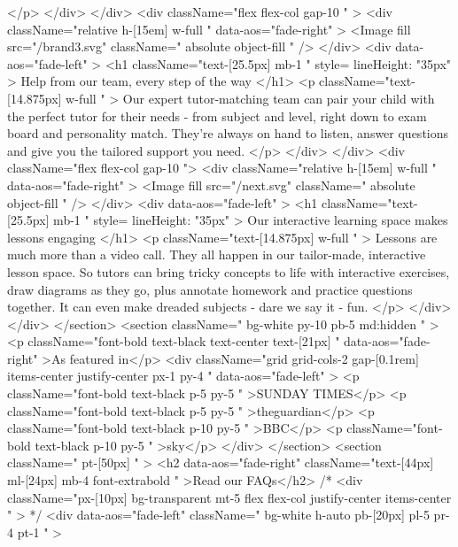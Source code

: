               </p>
            </div>
          </div>
          <div className="flex flex-col gap-10 "  >
            <div className="relative h-[15em] w-full  " data-aos="fade-right" >
              <Image
                fill
                src={"/brand3.svg"}
                className="  absolute  object-fill "
              />
            </div>
            <div data-aos="fade-left" >
              <h1 className="text-[25.5px] mb-1 " style={{ lineHeight: "35px" }} >
                Help from our team, every step of the way
              </h1>
              <p className="text-[14.875px] w-full  " >
                Our expert tutor-matching team can pair your child with the perfect tutor for their needs - from subject and level, right down to exam board and personality match. They’re always on hand to listen, answer questions and give you the tailored support you need.
              </p>
            </div>
          </div>
          <div className="flex flex-col gap-10 ">
            <div className="relative h-[15em] w-full  " data-aos="fade-right"  >
              <Image
                fill
                src={"/next.svg"}
                className="  absolute  object-fill "
              />
            </div>
            <div data-aos="fade-left" >
              <h1 className="text-[25.5px] mb-1 " style={{ lineHeight: "35px" }} >
                Our interactive learning space makes lessons engaging
              </h1>
              <p className="text-[14.875px] w-full  " >
                Lessons are much more than a video call. They all happen in our tailor-made, interactive lesson space. So tutors can bring tricky concepts to life with interactive exercises, draw diagrams as they go, plus annotate homework and practice questions together. It can even make dreaded subjects - dare we say it - fun.
              </p>
            </div>
          </div>
        </section>
        <section className=" bg-white py-10 pb-5 md:hidden " >
          <p className="font-bold text-black text-center text-[21px] " data-aos="fade-right" >As featured in</p>
          <div className="grid grid-cols-2 gap-[0.1rem] items-center justify-center px-1 py-4 " data-aos="fade-left" >
            <p className="font-bold text-black p-5  py-5 "   >SUNDAY TIMES</p>
            <p className="font-bold text-black p-5  py-5 "   >theguardian</p>
            <p className="font-bold text-black p-10 py-5 "   >BBC</p>
            <p className="font-bold text-black p-10 py-5 " >sky</p>
          </div>
        </section>
        <section className=" pt-[50px] " >
          <h2 data-aos="fade-right" className="text-[44px] ml-[24px] mb-4 font-extrabold  " >Read our FAQs</h2>
          {/* <div className="px-[10px] bg-transparent mt-5 flex flex-col justify-center items-center " > */}
          <div data-aos="fade-left" className=" bg-white  h-auto pb-[20px] pl-5 pr-4 pt-1 " >


